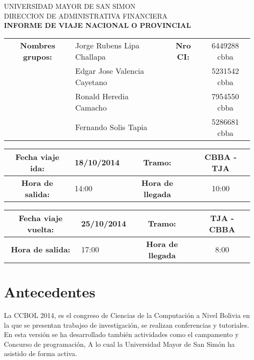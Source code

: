 \documentclass[letterpaper,12pt]{article}
\begin{document}
\begin{large}
	\begin{center}
		UNIVERSIDAD MAYOR DE SAN SIMON\\
		DIRECCION DE ADMINISTRATIVA FINANCIERA \\
		\textbf{INFORME DE VIAJE NACIONAL O PROVINCIAL}
	\end{center}
\end{large}
\vspace{.5cm}
\begin{center}
	\begin{tabular}{|c|l|c|c|}
	\hline
	 \textbf{Nombres grupos:} & Jorge Rubens Lipa Challapa & \textbf{Nro CI:} & 6449288 cbba\\
	  & Edgar Jose Valencia Cayetano & & 5231542 cbba \\
	  & Ronald Heredia Camacho & & 7954550 cbba\\
	  & Fernando Solis Tapia & & 5286681 cbba\\ \hline
	\end{tabular}
\end{center}
\vspace{.5cm}
\begin{center}
		\begin{tabular}{|c|l|c|c|}
		\hline
		 \textbf{Fecha viaje ida:} & 18/10/2014 & \textbf{Tramo:} & CBBA - TJA \\ \hline
		 \textbf{Hora de salida:} & 14:00 & \textbf{Hora de llegada} & 10:00 \\
		\hline
		\end{tabular}
\end{center}
\begin{center}	
	\begin{tabular}{|c|l|c|c|}
	\hline
	 \textbf{Fecha viaje vuelta:} & 25/10/2014 & \textbf{Tramo:} & TJA - CBBA \\ \hline
	 \textbf{Hora de salida:} & 17:00 & \textbf{Hora de llegada} & 8:00 \\
	\hline
	\end{tabular}		
\end{center}

	\section{Antecedentes}
	
	La CCBOL 2014, es el congreso de Ciencias de la Computaci\'on a Nivel Bolivia en la que se presentan trabajso de investigaci\'on, se realizan conferencias y tutoriales. En esta versi\'on se ha desarrollado tambi\'en  actividades como el campamento y Concurso de programaci\'on, A lo cual la Universidad Mayor de San Sim\'on ha asistido de forma activa.
	
\end{document}
